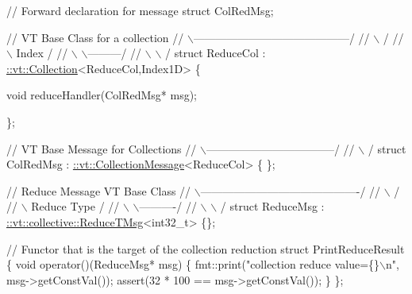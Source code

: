 \begin{DoxyCodeInclude}
\textcolor{comment}{// Forward declaration for message}
\textcolor{keyword}{struct }ColRedMsg;

\textcolor{comment}{//                  VT Base Class for a collection}
\textcolor{comment}{//            \(\backslash\)------------------------------------------/}
\textcolor{comment}{//             \(\backslash\)                                        /}
\textcolor{comment}{//              \(\backslash\)                              Index   /}
\textcolor{comment}{//               \(\backslash\)                          \(\backslash\)---------/}
\textcolor{comment}{//                \(\backslash\)                          \(\backslash\)       /}
\textcolor{keyword}{struct }ReduceCol : \hyperlink{structvt_1_1vrt_1_1collection_1_1_collection}{::vt::Collection}<ReduceCol,Index1D> \{

  \textcolor{keywordtype}{void} reduceHandler(ColRedMsg* msg);

\};

\textcolor{comment}{//                  VT Base Message for Collections}
\textcolor{comment}{//               \(\backslash\)-----------------------------------/}
\textcolor{comment}{//                \(\backslash\)                                 /}
\textcolor{keyword}{struct }ColRedMsg : \hyperlink{structvt_1_1vrt_1_1collection_1_1_collection_message}{::vt::CollectionMessage}<ReduceCol> \{ \};

\textcolor{comment}{//                    Reduce Message VT Base Class}
\textcolor{comment}{//              \(\backslash\)-------------------------------------------/}
\textcolor{comment}{//               \(\backslash\)                                         /}
\textcolor{comment}{//                \(\backslash\)                           Reduce Type /}
\textcolor{comment}{//                 \(\backslash\)                          \(\backslash\)----------/}
\textcolor{comment}{//                  \(\backslash\)                          \(\backslash\)        /}
\textcolor{keyword}{struct }ReduceMsg : \hyperlink{structvt_1_1collective_1_1reduce_1_1operators_1_1_reduce_t_msg}{::vt::collective::ReduceTMsg}<int32\_t> \{\};

\textcolor{comment}{// Functor that is the target of the collection reduction}
\textcolor{keyword}{struct }PrintReduceResult \{
  \textcolor{keywordtype}{void} operator()(ReduceMsg* msg) \{
    fmt::print(\textcolor{stringliteral}{"collection reduce value=\{\}\(\backslash\)n"}, msg->getConstVal());
    assert(32 * 100 == msg->getConstVal());
  \}
\};



\end{DoxyCodeInclude}
